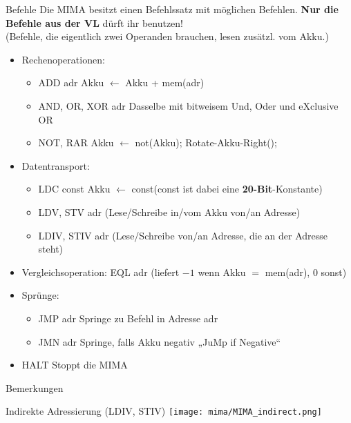 \newcommand{\itemizeconfig}{\setlength{\parsep}{0pt}\setlength{\parskip}{0pt}\setlength{\topsep}{0pt}\setlength{\partopsep}{0pt}}
\newcommand{\explain}[1]{\hfill {\small #1 }}
\begin{frame}{Befehle}
	Die MIMA besitzt einen Befehlssatz mit möglichen Befehlen. %
	\textbf{Nur die Befehle aus der VL} dürft ihr benutzen! \\ 
	\smallskip
	(Befehle, die eigentlich zwei Operanden brauchen, lesen zusätzl. vom Akku.)
	{
	\begin{itemize}[<+->] \itemizeconfig
		\item Rechenoperationen:
		\begin{itemize} 
			\item ADD adr \explain{Akku $\leftarrow$ Akku + mem(adr)}
			\item AND, OR, XOR adr \explain{Dasselbe mit bitweisem Und, Oder und eXclusive OR}
			\item NOT, RAR \explain{Akku $\leftarrow$ not(Akku); \quad  Rotate-Akku-Right();}
		\end{itemize}
		\item Datentransport:
		\begin{itemize}
			\item LDC const \explain{Akku $\leftarrow$ const\quad (const ist dabei eine \textbf{20-Bit}-Konstante) }
			\item LDV, STV adr \explain{(Lese/Schreibe in/vom Akku von/an Adresse)}
			\item LDIV, STIV adr \explain{(Lese/Schreibe von/an Adresse, die an der Adresse steht)}
		\end{itemize}
		\item Vergleichsoperation: EQL adr \explain{(liefert $-1$ wenn Akku $=$ mem(adr), 0 sonst)}
		\item Sprünge:
		\begin{itemize}
			\item JMP adr \explain{Springe zu Befehl in Adresse adr}
			\item JMN adr \explain{Springe, falls Akku negativ \quad „JuMp if Negative“}
		\end{itemize}
		\item HALT \explain{Stoppt die MIMA}
	\end{itemize}}
\end{frame}

\begin{frame}{Bemerkungen}
	\begin{block}{Indirekte Adressierung (LDIV, STIV)}
		\centering
		\texttt{[image: mima/MIMA\_indirect.png]}
	\end{block}
	
\end{frame}

